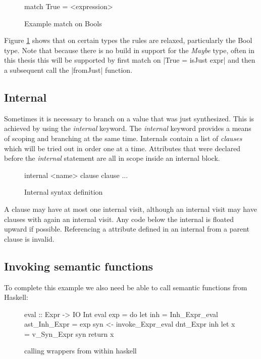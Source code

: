 \begin{figure}[h!]
\begin{code}
match True = <expression>
\end{code}
\caption{Example match on Bools}
\label{match:bool}
\end{figure}

Figure \ref{match:bool} shows that on certain types the rules are relaxed, particularly the Bool type. Note that because there is no build in support for the \emph{Maybe} type, often in this thesis this will be supported by first match on |True = isJust expr| and then a subsequent call the |fromJust| function.

\subsection{Internal}
Sometimes it is necessary to branch on a value that was just synthesized. This is achieved by using the \emph{internal} keyword. The \emph{internal} keyword provides a means of scoping and branching at the same time. Internals contain a list of \emph{clauses} which will be tried out in order one at a time. Attributes that were declared before the \emph{internal} statement are all in scope inside an internal block. 

\begin{figure}[h!]
\begin{code}
internal <name>
  {clause}
  {clause}
  ...
\end{code}
\caption{Internal syntax definition}
\label{internal:syntax}
\end{figure}

A clause may have at most one internal visit, although an internal visit may have clauses with again an internal visit.  Any code below the internal is floated upward if possible. Referencing a attribute defined in an internal from a parent clause is invalid.

\subsection{Invoking semantic functions}
\label{calling:sem}
To complete this example we also need be able to call semantic functions from Haskell:

\begin{figure}[H]
\begin{code}
eval :: Expr -> IO Int
eval exp = do
  let inh = Inh_Expr_eval { ast_Inh_Expr = exp }
  syn <- invoke_Expr_eval dnt_Expr inh
  let x = v_Syn_Expr syn
  return x
\end{code}
\caption{calling wrappers from within haskell}
\end{figure}

